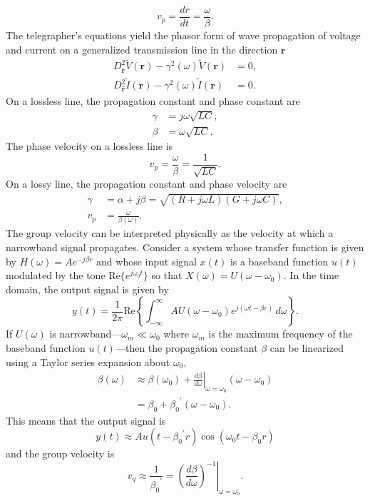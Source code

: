 \documentclass{article}
\begin{document}
\begin{equation}
	v_p=\frac{dr}{dt}=\frac{\omega}{\beta}.
\end{equation}
The telegrapher's equations yield the phasor form of wave propagation of voltage and current on a generalized transmission line in the direction $\mathbf{r}$
\begin{align}
	D^2_{\hat{\mathbf{r}}}\tilde{V}(\mathbf{r})-\gamma^2(\omega)\tilde{V}(\mathbf{r})&=0,\\
	D^2_{\hat{\mathbf{r}}}\tilde{I}(\mathbf{r})-\gamma^2(\omega)\tilde{I}(\mathbf{r})&=0.
\end{align}
On a lossless line, the propagation constant and phase constant are
\begin{align}
	\gamma&=j\omega\sqrt{LC},\\
	\beta&=\omega\sqrt{LC}.
\end{align}
The phase velocity on a lossless line is
\begin{equation}
	v_p=\frac{\omega}{\beta}=\frac{1}{\sqrt{LC}}.
\end{equation}
On a lossy line, the propagation constant and phase velocity are
\begin{align}
	\gamma&=\alpha+j\beta=\sqrt{(R+j\omega{L})(G+j\omega{C})},\\
	v_p&=\frac{\omega}{\beta(\omega)}.
\end{align}
The group velocity can be interpreted physically as the velocity at which a narrowband signal propagates. Consider a system whose transfer function is given by $H(\omega)=Ae^{-j\beta{r}}$ and whose input signal $x(t)$ is a baseband function $u(t)$ modulated by the tone $\mathrm{Re}\{e^{j\omega_0t}\}$ so that $X(\omega)=U(\omega-\omega_0)$. In the time domain, the output signal is given by
\begin{equation}
	y(t)=\frac{1}{2\pi}\mathrm{Re}\left\{\int^{\infty}_{-\infty}{AU(\omega-\omega_0)e^{j(\omega{t}-\beta{r})}\,d\omega}\right\}.
\end{equation}
If $U(\omega)$ is narrowband---$\omega_m\ll\omega_0$ where $\omega_m$ is the maximum frequency of the baseband function $u(t)$---then the propagation constant $\beta$ can be linearized using a Taylor series expansion about $\omega_0$,
\begin{equation}
	\begin{split}
		\beta(\omega)&\approx\beta(\omega_0)+\left.\frac{d\beta}{d\omega}\right|_{\omega=\omega_0}(\omega-\omega_0)\\
		&=\beta_0+{\beta_0}^\prime(\omega-\omega_0).
	\end{split}
\end{equation}
This means that the output signal is
\begin{equation}
	y(t)\approx{Au(t-{\beta_0}^\prime{r})\cos{(\omega_0t-\beta_0r)}}
\end{equation}
and the group velocity is
\begin{equation}
	v_g\approx\frac{1}{{\beta_0}^\prime}=\left.\left(\frac{d\beta}{d\omega}\right)^{-1}\right|_{\omega=\omega_0}.
\end{equation}
\end{document}
